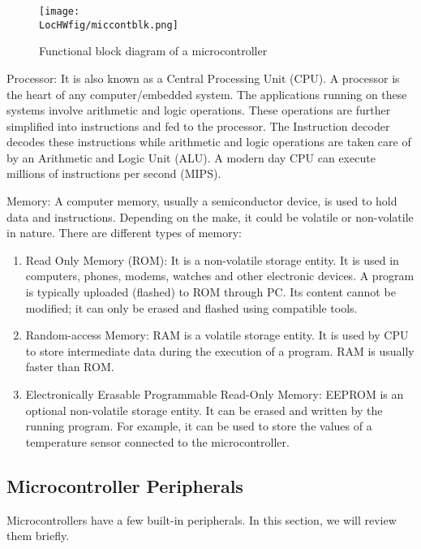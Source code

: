 \begin{figure}
\centering
\texttt{[image: \\LocHWfig/miccontblk.png]}
\caption{Functional block diagram of a microcontroller}
\label{micro-arch}
\end{figure}

\begin{description}
\item {Processor:} It is also known as a Central Processing Unit
  (CPU).  A processor is the heart of any computer/embedded
  system. The applications running on these systems involve arithmetic
  and logic operations. These operations are further simplified into
  instructions and fed to the processor.  The Instruction decoder
  decodes these instructions while arithmetic and logic operations are
  taken care of by an Arithmetic and Logic Unit (ALU). A modern day
  CPU can execute millions of instructions per second (MIPS). 

\item {Memory:}
A computer memory, usually a semiconductor device, is used to hold data and instructions. Depending on the make, it could be volatile or non-volatile in nature. There are different types of memory:
\begin{enumerate}
\item Read Only Memory (ROM): It is a non-volatile storage entity. It
  is used in computers, phones, modems, watches and other electronic
  devices. A program is typically uploaded (flashed) to ROM through PC.
  Its content cannot be modified; it can only be erased and flashed
  using compatible tools.
\item Random-access Memory: RAM is a volatile storage entity. It is
  used by CPU to store intermediate data during the execution of a
  program. RAM is usually faster than ROM.   
\item Electronically Erasable Programmable Read-Only Memory: EEPROM is
  an optional non-volatile storage entity. It can be erased and
  written by the running program.  For example, it can be used to
  store the values of a temperature sensor connected to the microcontroller.
\end{enumerate}
\end{description}

\subsection{Microcontroller Peripherals}
Microcontrollers have a few built-in peripherals.  In this section, we
will review them briefly.

